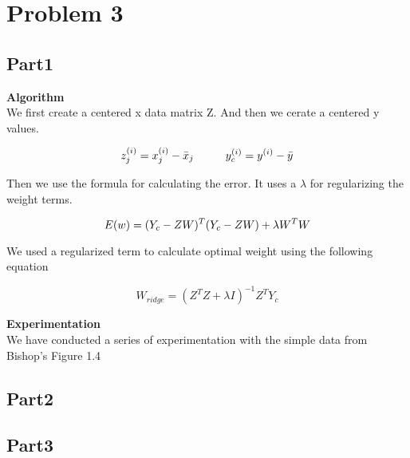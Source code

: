 \section{Problem 3}

\subsection{Part1}

{\bfseries Algorithm} \\
We first create a centered x data matrix Z. And then we cerate a centered y values.

\begin{equation}
z^{(i)}_{j} = x^{(i)}_{j} - \bar{x}_{j} \hspace{10 mm} 
y^{(i)}_{c} = y^{(i)} - \bar{y} \\
\end{equation}

Then we use the formula for calculating the error. It uses a $\lambda$ for regularizing the
weight terms. 

\begin{equation}
  E(w)= (Y_{c} - ZW)^T(Y_{c}-ZW) + \lambda W^TW \\
\end{equation}

We used a regularized term to calculate optimal weight using the following equation

\begin{equation}
  W_{ridge} = (Z^{T}Z + \lambda I)^{-1}Z^{T}Y_{c}
\end{equation}

{\bfseries Experimentation} \\
We have conducted a series of experimentation with the simple data from Bishop's Figure 1.4






\subsection{Part2}






\subsection{Part3}
